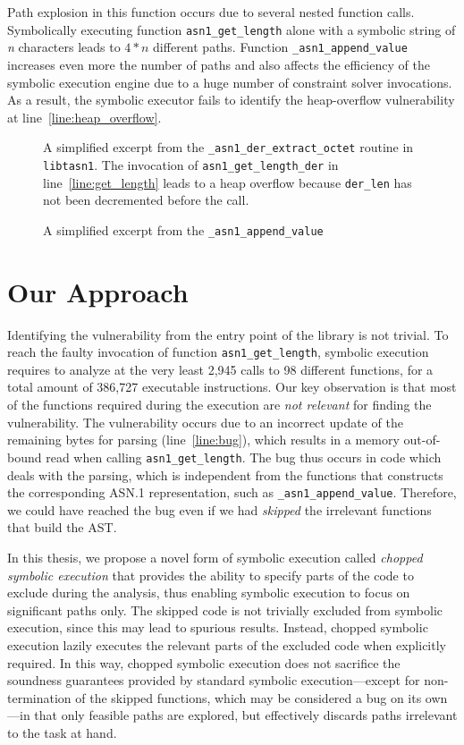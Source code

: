 Path explosion in this function occurs due to several nested function
calls. Symbolically executing function \texttt{asn1\_get\_length} alone with
a symbolic string of \textit{n} characters leads to $4*n$ different paths.
Function \texttt{\_asn1\_append\_value} increases even more the number
of paths and also affects the efficiency of the symbolic execution
engine due to a huge number of constraint solver invocations. As a
result, the symbolic executor fails to identify the heap-overflow
vulnerability at line~\ref{line:heap_overflow}.

\begin{figure}

\caption{
A simplified excerpt from the \texttt{\_asn1\_der\_extract\_octet} routine
in \texttt{libtasn1}. The invocation of \texttt{asn1\_get\_length\_der} in
line~\ref{line:get_length} leads to a heap overflow because
\texttt{der\_len} has not been decremented before the call.
}
\label{fig:intro-1}
\end{figure}

\begin{figure}

\caption{A simplified excerpt from the \texttt{\_asn1\_append\_value}}
\label{fig:intro-2}
\end{figure}

\section{Our Approach}
Identifying the vulnerability from the entry point of the library is not trivial.
To reach the faulty invocation of function \texttt{asn1\_get\_length},
symbolic execution requires to analyze at the very least 2,945 calls
to 98 different functions, for a total amount of 386,727 executable
instructions. Our key observation is that most of the functions
required during the execution are \textit{not relevant} for finding
the vulnerability. The vulnerability occurs due to an incorrect update
of the remaining bytes for parsing (line~\ref{line:bug}), which
results in a memory out-of-bound read when calling
\texttt{asn1\_get\_length}. The bug thus occurs in code which deals with the
parsing, which is independent from the functions that constructs the
corresponding ASN.1 representation, such as \texttt{\_asn1\_append\_value}.
Therefore, we could have reached the bug even if we had \emph{skipped}
the irrelevant functions that build the AST.

In this thesis, we propose a novel form of symbolic execution called
\emph{chopped symbolic execution} that provides the ability to specify
parts of the code to exclude during the analysis, thus enabling
symbolic execution to focus on significant paths only. The skipped
code is not trivially excluded from symbolic execution, since this may
lead to spurious results. Instead, chopped symbolic execution lazily
executes the relevant parts of the excluded code when explicitly
required. In this way, chopped symbolic execution does not sacrifice
the soundness guarantees provided by standard symbolic
execution---except for non-termination of the skipped functions, which
may be considered a bug on its own---in that only feasible paths are
explored, but effectively discards paths irrelevant to the task at
hand.

